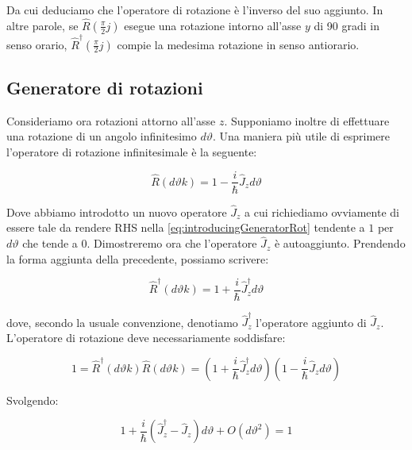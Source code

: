 Da cui deduciamo che l'operatore di rotazione \`e l'inverso del suo aggiunto. In altre parole, se $\hat{R}(\tfrac{\pi}{2} j)$ esegue una rotazione intorno all'asse $y$ di 90 gradi in senso orario, $\hat{R}^\dagger(\tfrac{\pi}{2} j) $ compie la medesima rotazione in senso antiorario. \\

\subsection{Generatore di rotazioni}

Consideriamo ora rotazioni attorno all'asse $z$. Supponiamo inoltre di effettuare una rotazione di un angolo infinitesimo $d \vartheta$. Una maniera pi\`u utile di esprimere l'operatore di rotazione infinitesimale \`e la seguente:

	\begin{equation} \label{eq:introducingGeneratorRot}
		\hat{R} ( { d \vartheta k } ) = 1 - \frac{i}{\hbar} \hat{J}_z d \vartheta
	\end{equation}

Dove abbiamo introdotto un nuovo operatore $\hat{J}_z$ a cui richiediamo ovviamente di essere tale da rendere RHS nella \eqref{eq:introducingGeneratorRot} tendente a $1$ per $d \vartheta$ che tende a $0$. Dimostreremo ora che l'operatore $\hat{J}_z$ \`e autoaggiunto. Prendendo la forma aggiunta della precedente, possiamo scrivere:

	\begin{equation} \label{eq:introducingGeneratorRot}
		\hat{R}^\dagger ( { d \vartheta k } ) = 1 + \frac{i}{\hbar} \hat{J}_z^\dagger d \vartheta
	\end{equation}

dove, secondo la usuale convenzione, denotiamo $\hat{J}_z^\dagger$ l'operatore aggiunto di $\hat{J}_z$. L'operatore di rotazione deve necessariamente soddisfare:

	\begin{equation}
	 	1 = \hat{R}^\dagger(d \vartheta k) \hat{R}(d \vartheta k) = \left ( 1 + \frac{i}{\hbar} \hat{J}_z^\dagger d \vartheta \right ) \left ( 1 - \frac{i}{\hbar} \hat{J}_z d \vartheta \right )
	\end{equation}

Svolgendo:

	\begin{equation} \label{eq:proofGeneratorHermitian}
		1 + \frac{i}{\hbar} \left ( \hat{J}^\dagger_z - \hat{J}_z \right ) d \vartheta + O(d \vartheta ^2) = 1
	\end{equation}


